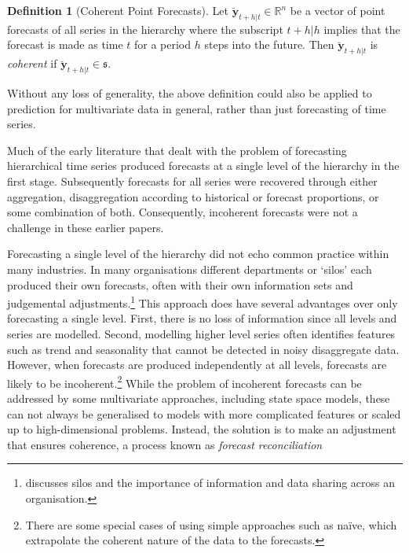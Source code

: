 \documentclass[12pt]{article}
\theoremstyle{definition}
\newtheorem{definition}{Definition}[section]
\begin{document}
\begin{definition}[Coherent Point Forecasts]\label{def:cohpoint}
  Let $\breve{\bm{y}}_{t+h|t} \in \mathbb{R}^n$ be a vector of point forecasts of all series in the hierarchy where the subscript $t+h|h$ implies that the forecast is made as time $t$ for a period $h$ steps into the future. Then $\breve{\bm{y}}_{t+h|t}$ is \emph{coherent} if $\breve{\bm{y}}_{t+h|t} \in \mathfrak{s}$.
\end{definition}

Without any loss of generality, the above definition could also be applied to prediction for multivariate data in general, rather than just forecasting of time series.

Much of the early literature that dealt with the problem of forecasting hierarchical time series \citep[see][and references therein]{Gross1990} produced forecasts at a single level of the hierarchy in the first stage. Subsequently forecasts for all series were recovered through {\color{blue} either} aggregation, disaggregation according to historical or forecast proportions, or some combination of both. Consequently, incoherent forecasts were not a challenge in these earlier papers.

Forecasting a single level of the hierarchy did not echo common practice within many industries. In many organisations different departments or `silos' each produced their own forecasts, often with their own information sets and judgemental adjustments.\footnote{\citet{Cha2013} discusses silos and the importance of information and data sharing across an organisation.} This approach does have several advantages over only forecasting a single level. First, there is no loss of information since all levels and series are modelled. Second, modelling higher level series often identifies features such as trend and seasonality that cannot be detected in noisy disaggregate data. However, when forecasts are produced independently at all levels, forecasts are likely to be incoherent.\footnote{There are some special cases of using simple approaches such as na\"{i}ve, which extrapolate the coherent nature of the data to the forecasts.} {\color{blue}While the problem of incoherent forecasts can be addressed by some multivariate approaches, including state space models, these can not always be generalised to models with more complicated features or scaled up to high-dimensional problems.}  Instead, the solution is to make an adjustment that ensures coherence, a process known as \emph{forecast reconciliation}
\end{document}
